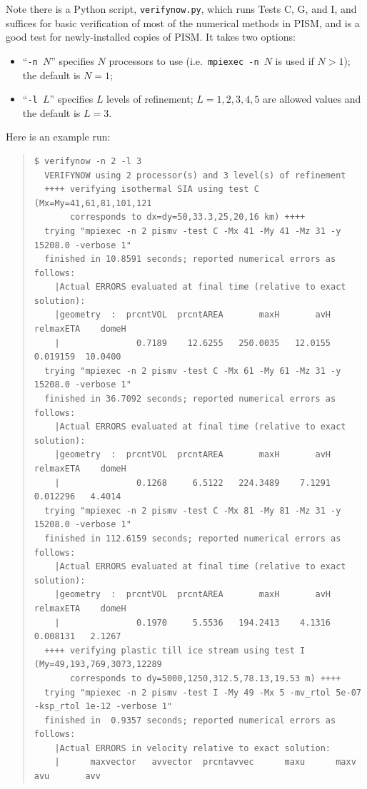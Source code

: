 \documentclass[12pt,final]{amsart}
\begin{document}
Note there is a Python script, \verb|verifynow.py|, which runs Tests C, G, and I, and suffices for basic verification of most of the numerical methods in PISM, and is a good test for newly-installed copies of PISM.  It takes two options:\begin{itemize}
\item ``\verb|-n |$N$'' specifies $N$ processors to use (i.e.~\verb|mpiexec -n |$N$ is used if $N>1$); the default is $N=1$;
\item ``\verb|-l |$L$'' specifies $L$ levels of refinement; $L=1,2,3,4,5$ are allowed values and the default is $L=3$.
\end{itemize}
Here is an example run:
\scriptsize\begin{quote}\begin{verbatim}
$ verifynow -n 2 -l 3
  VERIFYNOW using 2 processor(s) and 3 level(s) of refinement
  ++++ verifying isothermal SIA using test C (Mx=My=41,61,81,101,121
       corresponds to dx=dy=50,33.3,25,20,16 km) ++++
  trying "mpiexec -n 2 pismv -test C -Mx 41 -My 41 -Mz 31 -y 15208.0 -verbose 1"
  finished in 10.8591 seconds; reported numerical errors as follows:
    |Actual ERRORS evaluated at final time (relative to exact solution):
    |geometry  :  prcntVOL  prcntAREA       maxH       avH   relmaxETA    domeH
    |               0.7189    12.6255   250.0035   12.0155    0.019159  10.0400
  trying "mpiexec -n 2 pismv -test C -Mx 61 -My 61 -Mz 31 -y 15208.0 -verbose 1"
  finished in 36.7092 seconds; reported numerical errors as follows:
    |Actual ERRORS evaluated at final time (relative to exact solution):
    |geometry  :  prcntVOL  prcntAREA       maxH       avH   relmaxETA    domeH
    |               0.1268     6.5122   224.3489    7.1291    0.012296   4.4014
  trying "mpiexec -n 2 pismv -test C -Mx 81 -My 81 -Mz 31 -y 15208.0 -verbose 1"
  finished in 112.6159 seconds; reported numerical errors as follows:
    |Actual ERRORS evaluated at final time (relative to exact solution):
    |geometry  :  prcntVOL  prcntAREA       maxH       avH   relmaxETA    domeH
    |               0.1970     5.5536   194.2413    4.1316    0.008131   2.1267
  ++++ verifying plastic till ice stream using test I (My=49,193,769,3073,12289
       corresponds to dy=5000,1250,312.5,78.13,19.53 m) ++++
  trying "mpiexec -n 2 pismv -test I -My 49 -Mx 5 -mv_rtol 5e-07 -ksp_rtol 1e-12 -verbose 1"
  finished in  0.9357 seconds; reported numerical errors as follows:
    |Actual ERRORS in velocity relative to exact solution:
    |      maxvector   avvector  prcntavvec      maxu      maxv       avu       avv

\end{verbatim}
\end{quote}
\end{document}
